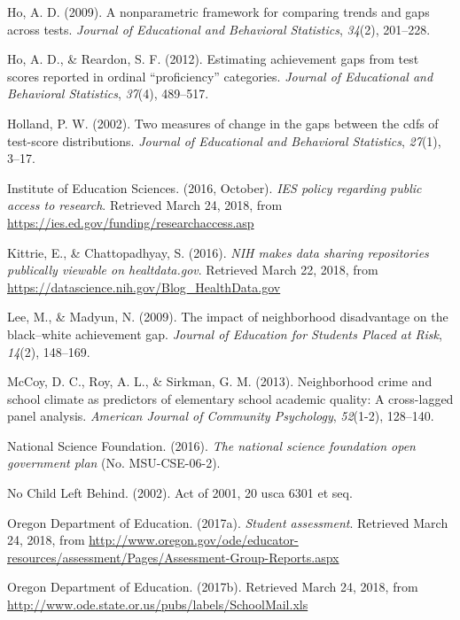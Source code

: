 \documentclass[man, fleqn, noextraspace]{apa6}
\theoremstyle{definition}
\theoremstyle{definition}
\theoremstyle{definition}
\theoremstyle{remark}
\begin{document}
\leavevmode\hypertarget{ref-ho09}{}%
Ho, A. D. (2009). A nonparametric framework for comparing trends and
gaps across tests. \emph{Journal of Educational and Behavioral
Statistics}, \emph{34}(2), 201--228.

\leavevmode\hypertarget{ref-ho12}{}%
Ho, A. D., \& Reardon, S. F. (2012). Estimating achievement gaps from
test scores reported in ordinal ``proficiency'' categories.
\emph{Journal of Educational and Behavioral Statistics}, \emph{37}(4),
489--517.

\leavevmode\hypertarget{ref-holland02}{}%
Holland, P. W. (2002). Two measures of change in the gaps between the
cdfs of test-score distributions. \emph{Journal of Educational and
Behavioral Statistics}, \emph{27}(1), 3--17.

\leavevmode\hypertarget{ref-ies16}{}%
Institute of Education Sciences. (2016, October). \emph{IES policy
regarding public access to research}. Retrieved March 24, 2018, from
\url{https://ies.ed.gov/funding/researchaccess.asp}

\leavevmode\hypertarget{ref-nih_16}{}%
Kittrie, E., \& Chattopadhyay, S. (2016). \emph{NIH makes data sharing
repositories publically viewable on healtdata.gov}. Retrieved March 22,
2018, from \url{https://datascience.nih.gov/Blog_HealthData.gov}

\leavevmode\hypertarget{ref-lee09}{}%
Lee, M., \& Madyun, N. (2009). The impact of neighborhood disadvantage
on the black--white achievement gap. \emph{Journal of Education for
Students Placed at Risk}, \emph{14}(2), 148--169.

\leavevmode\hypertarget{ref-mccoy13}{}%
McCoy, D. C., Roy, A. L., \& Sirkman, G. M. (2013). Neighborhood crime
and school climate as predictors of elementary school academic quality:
A cross-lagged panel analysis. \emph{American Journal of Community
Psychology}, \emph{52}(1-2), 128--140.

\leavevmode\hypertarget{ref-nsf16}{}%
National Science Foundation. (2016). \emph{The national science
foundation open government plan} (No. MSU-CSE-06-2).

\leavevmode\hypertarget{ref-nclb02}{}%
No Child Left Behind. (2002). Act of 2001, 20 usca 6301 et seq.

\leavevmode\hypertarget{ref-or17a}{}%
Oregon Department of Education. (2017a). \emph{Student assessment}.
Retrieved March 24, 2018, from
\url{http://www.oregon.gov/ode/educator-resources/assessment/Pages/Assessment-Group-Reports.aspx}

\leavevmode\hypertarget{ref-or17b}{}%
Oregon Department of Education. (2017b). Retrieved March 24, 2018, from
\url{http://www.ode.state.or.us/pubs/labels/SchoolMail.xls}
\end{document}
